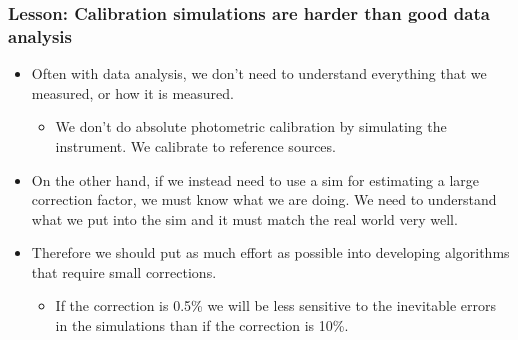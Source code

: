 \documentclass{beamer}
\begin{document}
\frame
{

    \frametitle{Lesson: Calibration simulations are harder than good data analysis}


    \begin{itemize}

        \item Often with data analysis, we don't need to understand everything that
            we measured, or how it is measured.

            \begin{itemize}

                \item We don't do absolute photometric calibration by
                    simulating the instrument.  We calibrate to reference
                    sources.

            \end{itemize}

        \item On the other hand, if we instead need to use a sim for estimating
            a large correction factor, we must know what we are doing. We need
            to understand what we put into the sim and it must match the real
            world very well.

        \item Therefore we should put as much effort as possible into developing
            algorithms that require small corrections.

            \begin{itemize}
    
                \item If the correction is 0.5\% we will be less sensitive to the
                    inevitable errors in the simulations than if the correction is 10\%.

            \end{itemize}

    \end{itemize}

}
\end{document}
